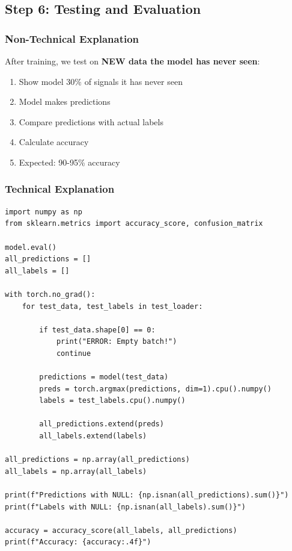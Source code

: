 \documentclass[12pt,a4paper]{article}
\begin{document}
\subsection{Step 6: Testing and Evaluation}

\subsubsection{Non-Technical Explanation}

After training, we test on \textbf{NEW data the model has never seen}:

\begin{tcolorbox}[colback=green!10,colframe=green!50!black,title=Testing Process]
\begin{enumerate}
    \item Show model 30\% of signals it has never seen
    \item Model makes predictions
    \item Compare predictions with actual labels
    \item Calculate accuracy
    \item Expected: 90-95\% accuracy
\end{enumerate}
\end{tcolorbox}

\subsubsection{Technical Explanation}

\begin{lstlisting}[caption={Evaluation with Quality Metrics}]
import numpy as np
from sklearn.metrics import accuracy_score, confusion_matrix

model.eval()
all_predictions = []
all_labels = []

with torch.no_grad():
    for test_data, test_labels in test_loader:
        
        if test_data.shape[0] == 0:
            print("ERROR: Empty batch!")
            continue
        
        predictions = model(test_data)
        preds = torch.argmax(predictions, dim=1).cpu().numpy()
        labels = test_labels.cpu().numpy()
        
        all_predictions.extend(preds)
        all_labels.extend(labels)

all_predictions = np.array(all_predictions)
all_labels = np.array(all_labels)

print(f"Predictions with NULL: {np.isnan(all_predictions).sum()}")
print(f"Labels with NULL: {np.isnan(all_labels).sum()}")

accuracy = accuracy_score(all_labels, all_predictions)
print(f"Accuracy: {accuracy:.4f}")
\end{lstlisting}
\end{document}
